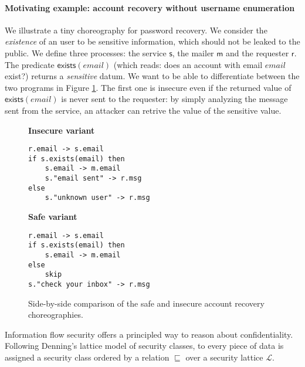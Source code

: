 \documentclass[12pt,a4paper,twoside]{book}
\newcommand{\MCL}{\mathscr{L}}
\begin{document}
\paragraph{Motivating example: account recovery without username enumeration}
We illustrate a tiny choreography for password recovery.
We consider the \emph{existence} of an user to be sensitive information, which should not be leaked to the public.
We define three processes: the service \(\mathsf{s}\), the mailer \(\mathsf{m}\) and the  requester \(\mathsf{r}\). The predicate
\(\mathsf{exists}(email)\) (which reads: does an account with email \(email\) exist?) returns a \emph{sensitive} datum. We want to be able to differentiate between the two programs in Figure \ref{fig:example}. The first one is insecure even if the returned value of $\mathsf{exists}(email)$ is never sent to the requester: by simply analyzing the message sent from the service, an attacker can retrive the value of the sensitive value.
\begin{figure}[t]
  \label{fig:example}
  \centering
  \begin{minipage}[t]{0.48\textwidth}
    \raggedright\textbf{Insecure variant}
    \vspace{0.3em}
\begin{lstlisting}[basicstyle=\ttfamily\small, frame=single, numbers=none]
r.email -> s.email
if s.exists(email) then
    s.email -> m.email
    s."email sent" -> r.msg
else
    s."unknown user" -> r.msg
\end{lstlisting}
  \end{minipage}
  \hfill
  \begin{minipage}[t]{0.48\textwidth}
    \raggedright\textbf{Safe variant}
    \vspace{0.3em}
\begin{lstlisting}[basicstyle=\ttfamily\small, frame=single, numbers=none]
r.email -> s.email
if s.exists(email) then
    s.email -> m.email
else
    skip
s."check your inbox" -> r.msg
\end{lstlisting}
  \end{minipage}

  \caption{Side-by-side comparison of the safe and insecure account recovery choreographies.} \end{figure}

\medskip
Information flow security offers a principled way to reason about confidentiality.
Following Denning's lattice model of security classes\cite{denning1976lattice}, to every piece of data is assigned a security class ordered by a relation $\sqsubseteq$ over a security lattice $\MCL$.
\end{document}
